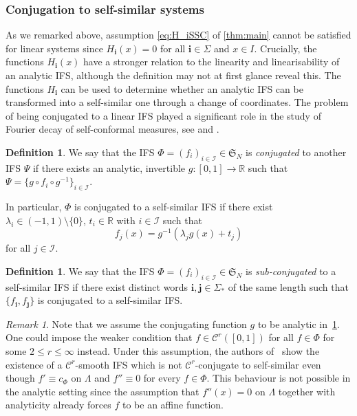 \documentclass[12pt,]{article}
\def\cref#1{\ref{#1}}%
\theoremstyle{definition}
\newtheorem{definition}[theorem]{Definition}
\theoremstyle{remark}
\newtheorem{remark}[theorem]{Remark}
\renewcommand{\Bbb}[1]{\mathbb{#1}}
\newcommand{\bbR}{{\Bbb R}}        %
\newcommand{\0}{\mathbf{0}}
\newcommand{\bi}{\mathbf{i}}
\newcommand{\bj}{\mathbf{j}}
\begin{document}
\subsubsection{Conjugation to self-similar systems}\label{sec:ConjLinSys}
As we remarked above, assumption \eqref{eq:H_iSSC} of \cref{thm:main} cannot be satisfied for linear systems since
$H_{\bi}(x)=0$ for all $\bi\in \Sigma$ and $x \in I$.
Crucially, the functions $H_{\bi}(x)$ have a stronger relation to the linearity and linearisability
of an analytic IFS, although the definition may not at first glance reveal this.
The functions $H_{\bi}$ can be used to determine whether an analytic IFS can be transformed into a
self-similar one through a change of coordinates.
The problem of being conjugated to a linear IFS played a significant role in the study of Fourier
decay of self-conformal measures, see
\cite{AlgomEtal_LogFourierDecaySelfConf_JLMS,BakerBanaji_PolyFourierDecay} and \cite[Corollary 1.2 part
3.]{AlgomEtal_PointwiseNormalityFDecaySelfSonf_AdvMath21}.

\begin{definition}\label{def:conjugation}
  We say that the IFS $\Phi = (f_i)_{i\in\mathcal{I}} \in\mathfrak{S}_N$ is 
\emph{conjugated} to another IFS $\Psi$ if there exists an analytic, invertible
  $g:[0,1]\to\bbR$ such that $\Psi=\{g\circ f_i\circ g^{-1}\}_{i\in\mathcal{I}}$. 
\end{definition}
In particular, $\Phi$
  is conjugated to a self-similar IFS if there exist $\lambda_i
\in(-1,1)\setminus\{0\}$, $t_i\in\bbR$ with $i\in\mathcal{I}$ such that
\[
f_{j}(x) = g^{-1}(\lambda_j g(x) + t_j)
\]
for all $j\in\mathcal{I}$.
\begin{definition}\label{def:subconjugation}
  We say that the IFS $\Phi = (f_i)_{i\in\mathcal{I}} \in\mathfrak{S}_N$ is 
  \emph{sub-conjugated} to a self-similar IFS if there exist distinct words $\bi,\bj\in\Sigma_*$ of
  the same length such that $\{f_{\bi},f_{\bj}\}$ is conjugated to a self-similar IFS.
\end{definition}

\begin{remark}
  Note that we assume the conjugating function $g$ to be analytic in~\cref{def:conjugation}. One could
  impose the weaker condition that $f\in\mathcal{C}^r([0,1])$ for all $f\in\Phi$ for some $2\leq r\leq
  \infty$ instead. Under this assumption, the authors of~\cite{AlgomEtal_NonLinHyperbolicIFS} show the
  existence of a $\mathcal{C}^r$-smooth IFS which is not $\mathcal{C}^r$-conjugate to self-similar
  even though $f'\equiv c_{\Phi}$ on $\Lambda$ and $f''\equiv 0$ for every $f\in\Phi$. This behaviour
  is not possible in the analytic setting since the assumption that $f''(x)=0$ on $\Lambda$ together
  with analyticity already forces $f$ to be an affine function. 
\end{remark}
\end{document}
